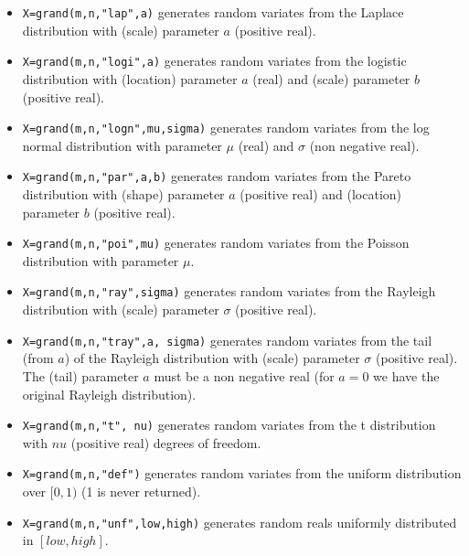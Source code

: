 \begin{description}
\begin{itemize}
\item {} 
  \verb!X=grand(m,n,"lap",a)! generates random variates from the Laplace 
  distribution with (scale) parameter $a$ (positive real).
  
\item {} 
  \verb!X=grand(m,n,"logi",a)! generates random variates from the logistic 
  distribution with (location) parameter $a$ (real) and (scale) parameter $b$ (positive real).
  
\item {} 
  \verb!X=grand(m,n,"logn",mu,sigma)! generates random variates from the log normal
  distribution with parameter $\mu$ (real) and  $\sigma$ (non negative real).
  
\item {} 
  \verb!X=grand(m,n,"par",a,b)! generates random variates from the Pareto 
  distribution with (shape) parameter $a$ (positive real) and (location) parameter $b$ (positive real).

\item {} \verb!X=grand(m,n,"poi",mu)! generates random
  variates from the Poisson distribution with parameter $\mu$. 
  
\item {} 
  \verb!X=grand(m,n,"ray",sigma)! generates random variates from the Rayleigh 
  distribution with (scale) parameter $\sigma$ (positive real).
  
\item {} 
  \verb!X=grand(m,n,"tray",a, sigma)! generates random variates from the
  tail (from $a$) of the Rayleigh distribution with (scale) parameter 
  $\sigma$ (positive real). The (tail) parameter $a$ must be a non negative
  real (for $a=0$ we have the original Rayleigh distribution).

\item {} 
  \verb!X=grand(m,n,"t", nu)! generates random variates from the t distribution 
  with $nu$ (positive real) degrees of freedom. 

\item {} \verb!X=grand(m,n,"def")! generates random variates from the uniform 
  distribution over $[0,1)$ (1 is never returned).

\item {} \verb!X=grand(m,n,"unf",low,high)! generates random reals uniformly distributed 
    in $[low, high]$.


\end{itemize}
\end{description}
